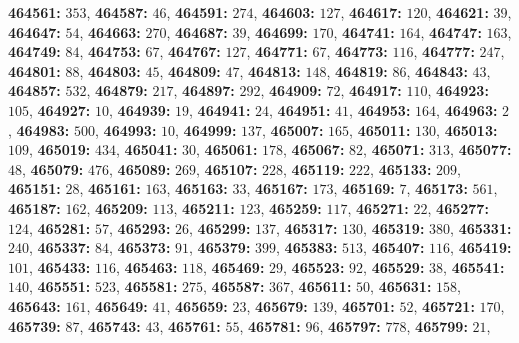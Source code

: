 \textsf{\bfseries 464561:} $353$, \textsf{\bfseries 464587:} $46$, \textsf{\bfseries 464591:} $274$, \textsf{\bfseries 464603:} $127$, \textsf{\bfseries 464617:} $120$, \textsf{\bfseries 464621:} $39$, \textsf{\bfseries 464647:} $54$, \textsf{\bfseries 464663:} $270$, \textsf{\bfseries 464687:} $39$, \textsf{\bfseries 464699:} $170$, \textsf{\bfseries 464741:} $164$, \textsf{\bfseries 464747:} $163$, \textsf{\bfseries 464749:} $84$, \textsf{\bfseries 464753:} $67$, \textsf{\bfseries 464767:} $127$, \textsf{\bfseries 464771:} $67$, \textsf{\bfseries 464773:} $116$, \textsf{\bfseries 464777:} $247$, \textsf{\bfseries 464801:} $88$, \textsf{\bfseries 464803:} $45$, \textsf{\bfseries 464809:} $47$, \textsf{\bfseries 464813:} $148$, \textsf{\bfseries 464819:} $86$, \textsf{\bfseries 464843:} $43$, \textsf{\bfseries 464857:} $532$, \textsf{\bfseries 464879:} $217$, \textsf{\bfseries 464897:} $292$, \textsf{\bfseries 464909:} $72$, \textsf{\bfseries 464917:} $110$, \textsf{\bfseries 464923:} $105$, \textsf{\bfseries 464927:} $10$, \textsf{\bfseries 464939:} $19$, \textsf{\bfseries 464941:} $24$, \textsf{\bfseries 464951:} $41$, \textsf{\bfseries 464953:} $164$, \textsf{\bfseries 464963:} $2$, \textsf{\bfseries 464983:} $500$, \textsf{\bfseries 464993:} $10$, \textsf{\bfseries 464999:} $137$, \textsf{\bfseries 465007:} $165$, \textsf{\bfseries 465011:} $130$, \textsf{\bfseries 465013:} $109$, \textsf{\bfseries 465019:} $434$, \textsf{\bfseries 465041:} $30$, \textsf{\bfseries 465061:} $178$, \textsf{\bfseries 465067:} $82$, \textsf{\bfseries 465071:} $313$, \textsf{\bfseries 465077:} $48$, \textsf{\bfseries 465079:} $476$, \textsf{\bfseries 465089:} $269$, \textsf{\bfseries 465107:} $228$, \textsf{\bfseries 465119:} $222$, \textsf{\bfseries 465133:} $209$, \textsf{\bfseries 465151:} $28$, \textsf{\bfseries 465161:} $163$, \textsf{\bfseries 465163:} $33$, \textsf{\bfseries 465167:} $173$, \textsf{\bfseries 465169:} $7$, \textsf{\bfseries 465173:} $561$, \textsf{\bfseries 465187:} $162$, \textsf{\bfseries 465209:} $113$, \textsf{\bfseries 465211:} $123$, \textsf{\bfseries 465259:} $117$, \textsf{\bfseries 465271:} $22$, \textsf{\bfseries 465277:} $124$, \textsf{\bfseries 465281:} $57$, \textsf{\bfseries 465293:} $26$, \textsf{\bfseries 465299:} $137$, \textsf{\bfseries 465317:} $130$, \textsf{\bfseries 465319:} $380$, \textsf{\bfseries 465331:} $240$, \textsf{\bfseries 465337:} $84$, \textsf{\bfseries 465373:} $91$, \textsf{\bfseries 465379:} $399$, \textsf{\bfseries 465383:} $513$, \textsf{\bfseries 465407:} $116$, \textsf{\bfseries 465419:} $101$, \textsf{\bfseries 465433:} $116$, \textsf{\bfseries 465463:} $118$, \textsf{\bfseries 465469:} $29$, \textsf{\bfseries 465523:} $92$, \textsf{\bfseries 465529:} $38$, \textsf{\bfseries 465541:} $140$, \textsf{\bfseries 465551:} $523$, \textsf{\bfseries 465581:} $275$, \textsf{\bfseries 465587:} $367$, \textsf{\bfseries 465611:} $50$, \textsf{\bfseries 465631:} $158$, \textsf{\bfseries 465643:} $161$, \textsf{\bfseries 465649:} $41$, \textsf{\bfseries 465659:} $23$, \textsf{\bfseries 465679:} $139$, \textsf{\bfseries 465701:} $52$, \textsf{\bfseries 465721:} $170$, \textsf{\bfseries 465739:} $87$, \textsf{\bfseries 465743:} $43$, \textsf{\bfseries 465761:} $55$, \textsf{\bfseries 465781:} $96$, \textsf{\bfseries 465797:} $778$, \textsf{\bfseries 465799:} $21$, 
